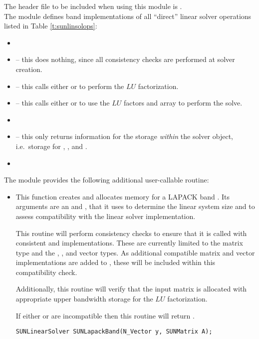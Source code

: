 \noindent The header file to be included when using this module 
is . \\
The {\sunlinsollapband} module defines band implementations of all
``direct'' linear solver operations listed in
Table \ref{t:sunlinsolops}:
\begin{itemize}
\item {}
\item {} -- this does nothing, since all
  consistency checks are performed at solver creation.
\item {} -- this calls either
   or  to perform the $LU$ factorization.
\item {} -- this calls either
   or  to use the $LU$ factors and 
  array to perform the solve.
\item {}
\item {} -- this only returns information for
  the storage \emph{within} the solver object, i.e.~storage
  for , , and .
\item {}
\end{itemize}
The module {\sunlinsollapband} provides the following additional
user-callable routine: 
\begin{itemize}


\item {}

  This function creates and allocates memory for a LAPACK band
  .  Its arguments are an {\nvector} and
  {\sunmatrix}, that it uses to determine the linear system size and
  to assess compatibility with the linear solver implementation.

  This routine will perform consistency checks to ensure that it is
  called with consistent {\nvector} and {\sunmatrix} implementations.
  These are currently limited to the {\sunmatband} matrix type and
  the {\nvecs}, {\nvecopenmp}, and {\nvecpthreads} vector types.  As
  additional compatible matrix and vector implementations are added to
  {\sundials}, these will be included within this compatibility check.

  Additionally, this routine will verify that the input matrix 
  is allocated with appropriate upper bandwidth storage for the $LU$
  factorization.

  If either  or  are incompatible then this routine will
  return .

  \verb|SUNLinearSolver SUNLapackBand(N_Vector y, SUNMatrix A);|

\end{itemize}
